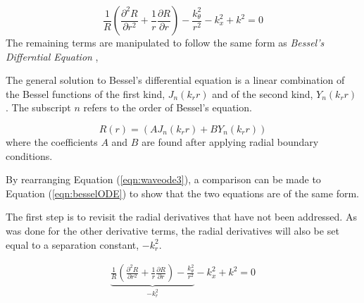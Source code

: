 
\begin{equation}
    \frac{1}{R}
    \left(      
    \frac{\partial^2 R}{\partial r^2 } +
    \frac{1}{r}\frac{\partial R}{\partial r}  
\right) -
    \frac{k_{\theta}^2}{r^2}-  
    k_x^2 + k^2 = 0
    \label{eqn:waveode3}
\end{equation}
The remaining terms are manipulated to follow the same form as \textit{Bessel's Differntial 
Equation} ,


The general solution to Bessel's differential equation is a linear combination of
the Bessel functions of the first kind, $J_n(k_r r)$ and of the second kind, $Y_n(k_r r)$ 
\cite{weisstein2002bessel}. The subscript $n$ refers to the order of Bessel's equation.

\begin{equation}
    R(r) = (AJ_n(k_r r) + BY_n(k_r r)) 
    \label{eqn:besselsolution}
\end{equation}
where the coefficients $A$ and $B$ are found after applying radial
boundary conditions. %

By rearranging Equation (\ref{eqn:waveode3}), a comparison can be made to Equation
(\ref{eqn:besselODE}) to show that the two equations are of the same form. 

The first step is to revisit the radial derivatives that have not been addressed.
As was done for the other derivative terms, the radial derivatives will also 
be set equal to a separation constant, $-k_r^2$. 

\begin{align}
    \underbrace{\frac{1}{R}
    \left(      
    \frac{\partial^2 R}{\partial r^2 } +
    \frac{1}{r}\frac{\partial R}{\partial r}  
\right) -
    \frac{k_{\theta}^2}{r^2}}_{-k_r^2}-  
    k_x^2 + k^2 = 0
    \label{eqn:wavenumber_without_kr}
\end{align}

